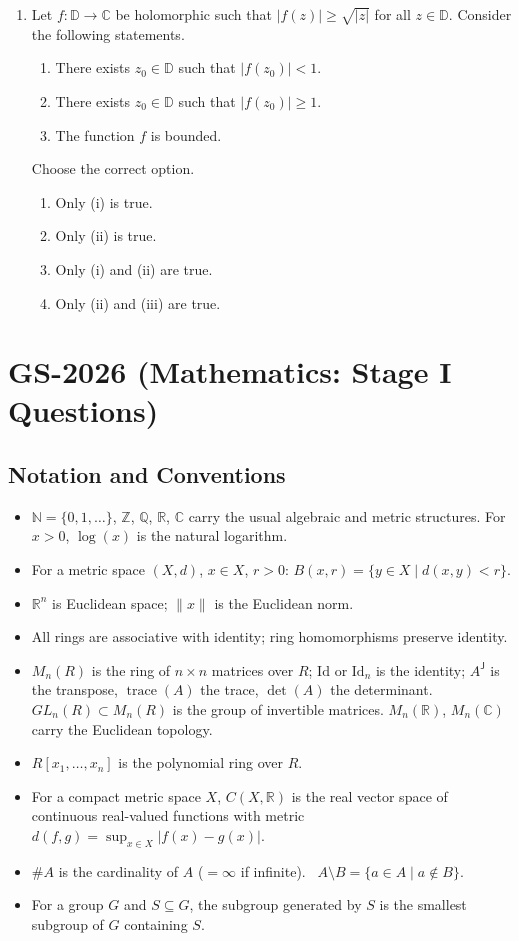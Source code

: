 \documentclass[11pt, a4paper]{article}
\begin{document}
\begin{enumerate}[resume]
\item Let $f:\mathbb{D}\to\mathbb{C}$ be holomorphic such that $|f(z)|\ge\sqrt{|z|}$ for all $z\in\mathbb{D}$. Consider the following statements.
\begin{enumerate}[label=(\roman*)]
\item There exists $z_0\in\mathbb{D}$ such that $|f(z_0)|<1$.
\item There exists $z_0\in\mathbb{D}$ such that $|f(z_0)|\ge1$.
\item The function $f$ is bounded.
\end{enumerate}
Choose the correct option.
\begin{enumerate}[label=(\alph*)]
\item Only (i) is true.
\item Only (ii) is true.
\item Only (i) and (ii) are true.
\item Only (ii) and (iii) are true.
\end{enumerate}
\end{enumerate}

\newpage
\section{GS-2026 (Mathematics: Stage I Questions)}
\subsection*{Notation and Conventions}
\begin{itemize}
\item $\mathbb{N}=\{0,1,\ldots\}$, $\mathbb{Z}$, $\mathbb{Q}$, $\mathbb{R}$, $\mathbb{C}$ carry the usual algebraic and metric structures. For $x>0$, $\log(x)$ is the natural logarithm.
\item For a metric space $(X,d)$, $x\in X$, $r>0$: $B(x,r)=\{y\in X\mid d(x,y)<r\}$.
\item $\mathbb{R}^n$ is Euclidean space; $\|x\|$ is the Euclidean norm.
\item All rings are associative with identity; ring homomorphisms preserve identity.
\item $M_n(R)$ is the ring of $n\times n$ matrices over $R$; $\mathrm{Id}$ or $\mathrm{Id}_n$ is the identity; $A^{\mathsf J}$ is the transpose, $\operatorname{trace}(A)$ the trace, $\det(A)$ the determinant. $GL_n(R)\subset M_n(R)$ is the group of invertible matrices. $M_n(\mathbb{R})$, $M_n(\mathbb{C})$ carry the Euclidean topology.
\item $R[x_1,\ldots,x_n]$ is the polynomial ring over $R$.
\item For a compact metric space $X$, $C(X,\mathbb{R})$ is the real vector space of continuous real-valued functions with metric $d(f,g)=\sup_{x\in X}|f(x)-g(x)|$.
\item $\#A$ is the cardinality of $A$ ($=\infty$ if infinite). \ $A\setminus B=\{a\in A\mid a\notin B\}$.
\item For a group $G$ and $S\subseteq G$, the subgroup generated by $S$ is the smallest subgroup of $G$ containing $S$.
\end{itemize}
\end{document}
